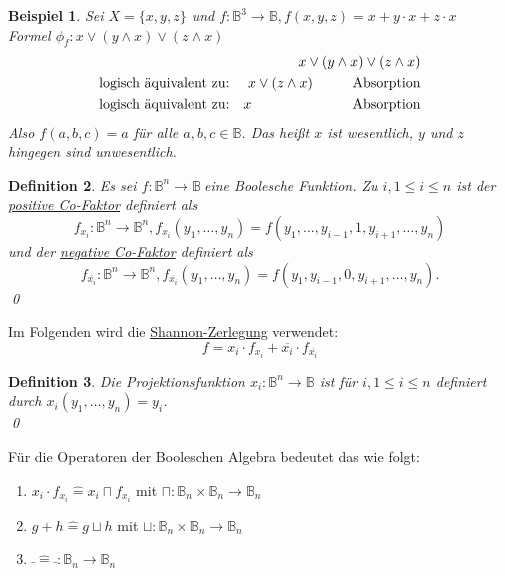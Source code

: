 \documentclass[ngerman]{scrartcl}
\theoremstyle{custom}
\newtheorem{mdef}{Definition} \numberwithin{mdef}{subsection}
\newtheorem{mex}[mdef]{Beispiel}
\newcommand{\0}{\mathbf{0}}
\newcommand{\1}{\mathbf{L}}
\newcommand{\bol}{\mathds{B}^n \rightarrow \mathds{B}}
\newcommand{\bolf}{$f: \bol~$}
\begin{document}
\begin{mex}
Sei $X = \{x ,y ,z \} $ und $f: \mathds{B}^3 \rightarrow \mathds{B},
f(x,y,z) = x + y \cdot x + z \cdot x$\\
Formel $\phi_f: x \vee (y \wedge x) \vee (z \wedge x)$
\begin{eqnarray*}
&&x \vee (y \wedge x) \vee (z \wedge x) \\
&\text{logisch \"aquivalent zu:}& x \vee (z \wedge x) \hspace{1cm} \text{Absorption}\\
&\text{logisch \"aquivalent zu:}& x \hspace{2,55cm} \text{Absorption}
\end{eqnarray*}
Also $f(a,b,c) = a$  f\"ur alle $a,b,c \in \mathds{B}$. Das hei\ss t
$x$ ist wesentlich, $y$ und $z$ hingegen sind unwesentlich.
\end{mex}

\begin{mdef}
Es sei \bolf eine Boolesche Funktion. Zu $i, 1 \leq i \leq n$ ist der
\underline{positive Co-Faktor} definiert als
\begin{equation*}
f_{x_i}: \mathds{B}^n \rightarrow \mathds{B}^n, f_{x_i}(y_1, \dots,
y_n)= f(y_1, \dots, y_{i-1}, 1, y_{i+1}, \dots, y_n)
\end{equation*}
und der \underline{negative Co-Faktor} definiert als
\begin{equation*}
f_{\overline{x_i}}: \mathds{B}^n \rightarrow \mathds{B}^n,
f_{\overline{x_i}}(y_1, \dots, y_n) = f(y_1, y_{i-1},
0, y_{i+1}, \dots, y_n).
\end{equation*}
\qed
\end{mdef}

Im Folgenden wird die \underline{Shannon-Zerlegung} verwendet:
\begin{equation*} f = x_i \cdot f_{x_i} + \overline{x_i} \cdot
  f_{\overline{x_i}} \end{equation*}

\begin{mdef}
Die Projektionsfunktion $x_i: \bol$ ist f\"ur $i, 1 \leq i \leq n$
definiert durch $x_i(y_1, \dots, y_n) = y_i$.\\
\qed
\end{mdef}

F\"ur die Operatoren der Booleschen Algebra bedeutet das wie folgt:\\
\begin{enumerate}
\item $x_i \cdot f_{x_i} \mathrel{\widehat{=}} x_i \sqcap f_{x_i}$ mit
$\sqcap: \mathds{B}_n \times \mathds{B}_n \rightarrow \mathds{B}_n$
\item $g + h \mathrel{\widehat{=}} g \sqcup h$ mit
$\sqcup: \mathds{B}_n \times \mathds{B}_n \rightarrow \mathds{B}_n$
\item $\bar ~ \mathrel{\widehat{=}} \bar ~: \mathds{B}_n
  \rightarrow \mathds{B}_n$
\end{enumerate}
\end{document}
